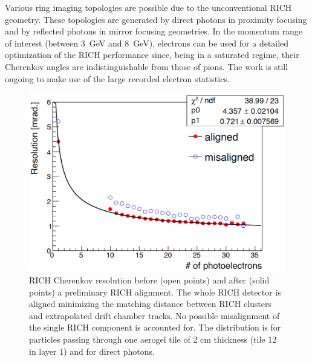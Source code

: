 \documentclass[5p,times,twocolumn]{elsarticle}
\begin{document}
Various ring imaging topologies are possible due to the  unconventional RICH geometry. These topologies are generated
by direct photons in proximity focusing and by reflected photons in mirror focusing geometries. In the momentum
range of interest (between 3~GeV and 8~GeV), electrons can be used for a detailed optimization of the RICH
performance since, being in a saturated regime, their Cherenkov angles are indistinguishable from those of pions.
The work is still ongoing to make use of the large recorded electron statistics.

\begin{figure}[t]
\begin{center}
\includegraphics[width=1.0\columnwidth]{Tile12_rms_plot2.png}
\end{center}
\caption{RICH Cherenkov resolution before (open points) and after (solid points) a preliminary RICH alignment. The whole RICH
  detector is aligned minimizing the matching distance between RICH clusters and extrapolated drift chamber tracks. No
  possible misalignment of the single RICH component is accounted for. The distribution is for particles passing through
  one aerogel tile of 2 cm thickness (tile 12 in layer 1) and for direct photons.}
\label{Fig:Align}
\end{figure}
\end{document}
